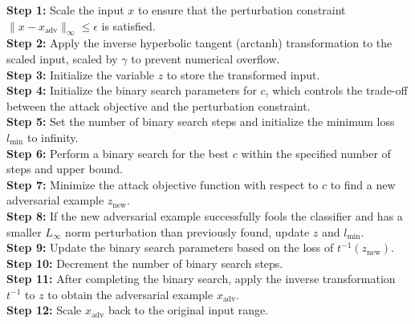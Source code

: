 \textbf{Step 1:} Scale the input $x$ to ensure that the perturbation constraint $\|x - x_{\text{adv}}\|_{\infty} \leq \epsilon$ is satisfied. \\
\textbf{Step 2:} Apply the inverse hyperbolic tangent (arctanh) transformation to the scaled input, scaled by $\gamma$ to prevent numerical overflow. \\
\textbf{Step 3:} Initialize the variable $z$ to store the transformed input. \\
\textbf{Step 4:} Initialize the binary search parameters for $c$, which controls the trade-off between the attack objective and the perturbation constraint. \\
\textbf{Step 5:} Set the number of binary search steps and initialize the minimum loss $l_{\text{min}}$ to infinity. \\
\textbf{Step 6:} Perform a binary search for the best $c$ within the specified number of steps and upper bound.\\
\textbf{Step 7:} Minimize the attack objective function with respect to $c$ to find a new adversarial example $z_{\text{new}}$. \\
\textbf{Step 8:} If the new adversarial example successfully fools the classifier and has a smaller $L_{\infty}$ norm perturbation than previously found, update $z$ and $l_{\text{min}}$. \\
\textbf{Step 9:} Update the binary search parameters based on the loss of $t^{-1}(z_{\text{new}})$. \\
\textbf{Step 10:} Decrement the number of binary search steps. \\
\textbf{Step 11:} After completing the binary search, apply the inverse transformation $t^{-1}$ to $z$ to obtain the adversarial example $x_{\text{adv}}$. \\
\textbf{Step 12:} Scale $x_{\text{adv}}$ back to the original input range.